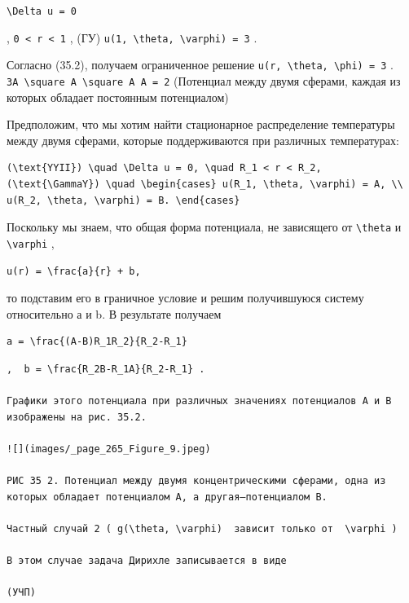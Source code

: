 \documentclass[
  ukrainian,
]{article}
\begin{document}
\texttt{\textbackslash{}Delta\ u\ =\ 0}

, \texttt{0\ \textless{}\ r\ \textless{}\ 1} , (ГУ)
\texttt{u(1,\ \textbackslash{}theta,\ \textbackslash{}varphi)\ =\ 3} .

Согласно (35.2), получаем ограниченное решение
\texttt{u(r,\ \textbackslash{}theta,\ \textbackslash{}phi)\ =\ 3} .
\texttt{3A\ \textbackslash{}square\ A\ \textbackslash{}square\ A\ A\ =\ 2}
(Потенциал между двумя сферами, каждая из которых обладает постоянным
потенциалом)

Предположим, что мы хотим найти стационарное распределение температуры
между двумя сферами, которые поддерживаются при различных температурах:

\begin{verbatim}
(\text{YYII}) \quad \Delta u = 0, \quad R_1 < r < R_2,
(\text{\GammaY}) \quad \begin{cases} u(R_1, \theta, \varphi) = A, \\ u(R_2, \theta, \varphi) = B. \end{cases}
\end{verbatim}

Поскольку мы знаем, что общая форма потенциала, не зависящего от
\texttt{\textbackslash{}theta} и \texttt{\textbackslash{}varphi} ,

\begin{verbatim}
u(r) = \frac{a}{r} + b,
\end{verbatim}

то подставим его в граничное условие и решим получившуюся систему
относительно а и b. В результате получаем

\begin{verbatim}
a = \frac{(A-B)R_1R_2}{R_2-R_1}
\end{verbatim}

\begin{verbatim}
,  b = \frac{R_2B-R_1A}{R_2-R_1} .

Графики этого потенциала при различных значениях потенциалов A и B изображены на рис. 35.2.

![](images/_page_265_Figure_9.jpeg)

РИС 35 2. Потенциал между двумя концентрическими сферами, одна из которых обладает потенциалом A, а другая—потенциалом B.

Частный случай 2 ( g(\theta, \varphi)  зависит только от  \varphi )

В этом случае задача Дирихле записывается в виде

(УЧП)
\end{verbatim}
\end{document}

